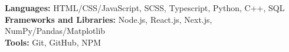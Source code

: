 

\begin{cvparagraph}

\textbf{Languages:} HTML/CSS/JavaScript, SCSS, Typescript, Python, C++, SQL \\
\textbf{Frameworks and Libraries:} Node.js, React.js, Next.js, NumPy/Pandas/Matplotlib \\
\textbf{Tools:} Git, GitHub, NPM 
    
\end{cvparagraph}
